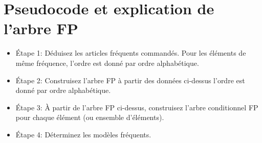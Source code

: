 \documentclass[a4paper,12pt]{article}
\begin{document}
\section{Pseudocode et explication de l'arbre FP}
\begin{itemize}
    \item Étape 1: Déduisez les articles fréquents commandés. Pour les éléments de même fréquence, l'ordre est donné par ordre alphabétique.
    \item Étape 2: Construisez l'arbre FP à partir des données ci-dessus l'ordre est donné par ordre alphabétique.
    \item Étape 3: À partir de l'arbre FP ci-dessus, construisez l'arbre conditionnel FP pour chaque élément (ou ensemble d'éléments).
    \item Étape 4: Déterminez les modèles fréquents.
\end{itemize}
\end{document}
